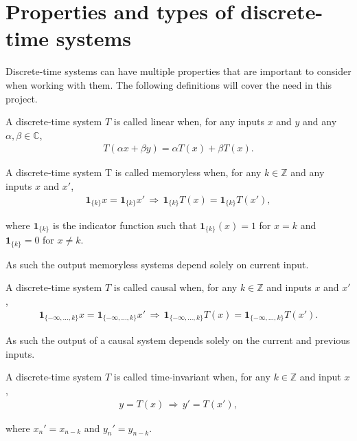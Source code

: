 \section{Properties and types of discrete-time systems}\label{sec:properties_DTS}
Discrete-time systems can have multiple properties that are important to consider when working with them. The following definitions will cover the need in this project.
\begin{definition}\label{def:linear_system}
A discrete-time system $T$ is called linear when, for any inputs $x$ and $y$ and any $\alpha,\beta\in\mathbb{C}$,
\begin{align}
T(\alpha x + \beta y) = \alpha T(x) + \beta T(x).
\end{align}
\end{definition}

\begin{definition}\label{def:memoryless_system}
A discrete-time system T is called memoryless when, for any $k\in\mathbb{Z}$ and any inputs $x$ and $x'$,
\begin{align}
\mathbf{1}_{\{k\}}x=\mathbf{1}_{\{k\}}x'\,\Rightarrow\,\mathbf{1}_{\{k\}}T(x)=\mathbf{1}_{\{k\}}T(x'),
\end{align}

where $\mathbf{1}_{\{k\}}$ is the indicator function such that $\mathbf{1}_{\{k\}}(x)=1$ for $x=k$ and $\mathbf{1}_{\{k\}}=0$ for $x\neq k$.
\end{definition}

As such the output memoryless systems depend solely on current input.
\begin{definition}\label{def:causal_system}
A discrete-time system $T$ is called causal when, for any $k\in\mathbb{Z}$ and inputs $x$ and $x'$,
\begin{align}
\mathbf{1}_{\{-\infty,\ldots,k\}}x=\mathbf{1}_{\{-\infty,\ldots,k\}}x'\,\Rightarrow\,\mathbf{1}_{\{-\infty,\ldots,k\}}T(x)=\mathbf{1}_{\{-\infty,\ldots,k\}}T(x').
\end{align}
\end{definition}

As such the output of a causal system depends solely on the current and previous inputs.

\begin{definition}\label{def:time_invariant_system}
A discrete-time system $T$ is called time-invariant when, for any $k\in\mathbb{Z}$ and input $x$,
\begin{align}
y=T(x)\,\Rightarrow\,y'=T(x'),
\end{align}

where $x_n'=x_{n-k}$ and $y_n'=y_{n-k}$.
\end{definition}

